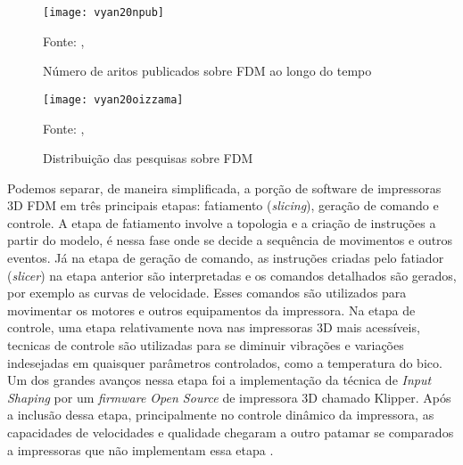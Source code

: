 \begin{figure}[!htb]
    \centering
    \caption{Número de aritos publicados sobre FDM ao longo do tempo}
    \texttt{[image: vyan20npub]}
    
    {\footnotesize Fonte: \citeauthor{vyavahare20}, \citeyear{vyavahare20}}
    \label{fig:numero_artigos}
\end{figure}

\begin{figure}[!htb]
    \centering
    \caption{Distribuição das pesquisas sobre FDM}
    \texttt{[image: vyan20oizzama]}

    {\footnotesize Fonte: \citeauthor{vyavahare20}, \citeyear{vyavahare20}}
    \label{fig:distr_artigos}
\end{figure}

Podemos separar, de maneira simplificada, a porção de software de impressoras 3D
FDM em três principais etapas: fatiamento (\textit{slicing}), geração de comando e controle.
A etapa de fatiamento involve a topologia e a criação de instruções a partir do modelo,
é nessa fase onde se decide a sequência de movimentos e outros eventos.
Já na etapa de geração de comando, as instruções criadas pelo fatiador (\textit{slicer}) na etapa anterior
são interpretadas e os comandos detalhados são gerados, por exemplo as curvas de velocidade.
Esses comandos são utilizados para movimentar os motores e outros equipamentos da impressora.
Na etapa de controle, uma etapa relativamente nova nas impressoras 3D mais acessíveis, 
tecnicas de controle são utilizadas para se diminuir vibrações e variações indesejadas em quaisquer
parâmetros controlados, como a temperatura do bico. Um dos grandes avanços nessa etapa
foi a implementação da técnica de \textit{Input Shaping} por um \textit{firmware Open Source} de impressora 3D chamado Klipper.
Após a inclusão dessa etapa, principalmente no controle dinâmico da impressora, as capacidades
de velocidades e qualidade chegaram a outro patamar se comparados a impressoras que não implementam essa etapa \cite{klipperdoc}.

